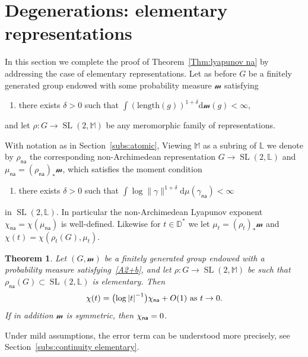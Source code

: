 \documentclass[10pt]{amsart}
\newtheorem{theo}{Theorem}[section]
\theoremstyle{definition}\newtheorem{defi}[theo]{Definition}\newtheorem{rema}[theo]{Remark}\newtheorem{exam}[theo]{Example}\newtheorem{exem}[theo]{Example}\newtheorem{nota}[theo]{Notation}
\DeclareMathOperator{\SL}{SL}
\newcommand{\sm}{\mathcal{m}}
\newcommand{\mm}{\mathbb{M}}
\newcommand{\D}{\mathbb{D}}
\newcommand{\cv}{\rightarrow}
\newcommand{\abs}[1]{\left\vert#1\right\vert}
\newcommand{\Laurent}{\mathbb{L}}
\newcommand{\na}{\mathsf{na}}
\newcommand{\inv}{^{-1}}
\newcommand*{\dd}{\mathrm{d}}
\newcommand*{\dmu}{\dd \mu}
\newcommand*{\dsm}{\dd \sm}
\begin{document}
\section{Degenerations: elementary representations}\label{sec:elem}

In this section we complete the proof of Theorem~\ref{Thm:lyapunov na} by addressing the case of elementary representations. Let as before $G$ be a finitely generated group endowed with some probability measure $\sm$ satisfying
\begin{enumerate}\renewcommand*{\theenumi}{A\arabic{enumi}${}^+$}\setcounter{enumi}{1}
\item \label{A2+b} there exists $\delta>0$ such that $\int (\mathrm{length}(g))^{1+\delta} \dsm(g)<\infty$,
\end{enumerate}
and let $\rho :G\to \SL(2, \mm)$ be any meromorphic family of representations.

With notation as in Section~\ref{subs:atomic}, Viewing $\mm$ as a subring of $\Laurent$ we denote by $\rho_\na$ the corresponding non-Archimedean representation $G\to \SL(2, \Laurent)$ and $\mu_\na = (\rho_\na)_* \sm$, which satisfies the moment condition
\begin{enumerate}\renewcommand*{\theenumi}{B\arabic{enumi}${}^+$}\setcounter{enumi}{1}
\item \label{B2+b} there exists $\delta>0$ such that $\int \log \|\gamma\|^{1+\delta} \dmu(\gamma_\na)<\infty$
\end{enumerate}
in $\SL(2, \Laurent)$. In particular the non-Archimedean Lyapunov exponent $\chi_\na = \chi(\mu_\na)$ is well-defined. Likewise for $t\in \D^*$ we let $\mu_t = (\rho_t)_* \sm$ and $\chi(t) = \chi(\rho_t(G), \mu_t)$.

\begin{theo} \label{thm:degeneration elementary}
Let $(G, \sm)$ be a finitely generated group endowed with a probability measure satisfying~\eqref{A2+b}, and let $\rho: G\to \SL(2, \mm)$ be such that $ \rho_\na(G) \subset \SL(2,\Laurent)$ is elementary. Then
\begin{equation}\label{eq:lyapunov elementary}
\chi(t) = \big({\log\abs{t}\inv} \big) \chi_{\sf na} + O(1) \text{ as } t\cv 0.
\end{equation}
If in addition $\sm$ is symmetric, then $\chi_{\sf na} = 0$.
\end{theo}

Under mild assumptions, the error term can be understood more precisely, see Section~\ref{subs:continuity elementary}.
\end{document}
